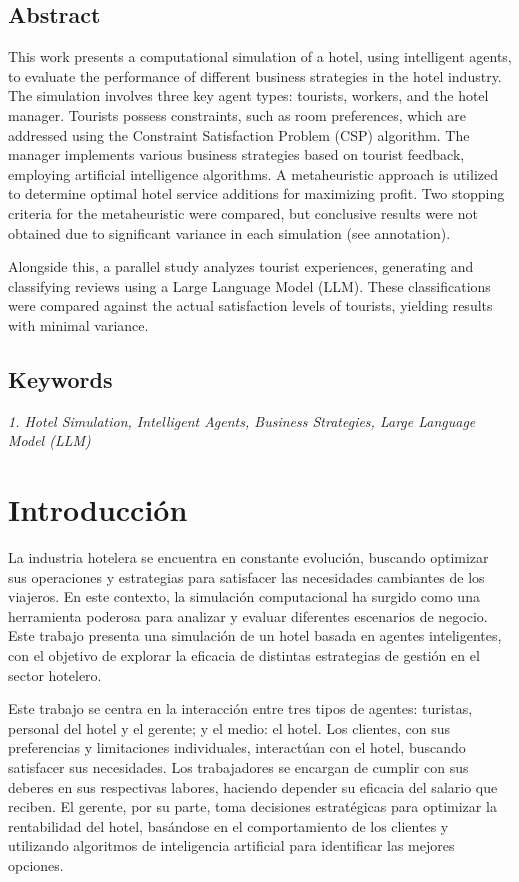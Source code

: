 \documentclass[12pt,a4paper]{article} \usepackage[spanish]{babel} \usepackage{graphicx} \usepackage{amsmath} \usepackage{amsfonts} \usepackage{amssymb} \usepackage{float} \usepackage{geometry}
\begin{document}
\subsection*{Abstract} This work presents a computational simulation of a hotel, using intelligent agents, to evaluate the performance of different business strategies in the hotel industry. The simulation involves three key agent types: tourists, workers, and the hotel manager. Tourists possess constraints, such as room preferences, which are addressed using the Constraint Satisfaction Problem (CSP) algorithm. The manager implements various business strategies based on tourist feedback, employing artificial intelligence algorithms. A metaheuristic approach is utilized to determine optimal hotel service additions for maximizing profit. Two stopping criteria for the metaheuristic were compared, but conclusive results were not obtained due to significant variance in each simulation (see annotation). 

Alongside this, a parallel study analyzes tourist experiences, generating and classifying reviews using a Large Language Model (LLM). These classifications were compared against the actual satisfaction levels of tourists, yielding results with minimal variance.

\subsection*{Keywords}\textit{1. Hotel Simulation, Intelligent Agents, Business Strategies, Large Language Model (LLM)}

\vspace{-1em} \hrulefill

\section{Introducción}

La industria hotelera se encuentra en constante evolución, buscando optimizar sus operaciones y estrategias para satisfacer las necesidades cambiantes de los viajeros. En este contexto, la simulación computacional ha surgido como una herramienta poderosa para analizar y evaluar diferentes escenarios de negocio. Este trabajo presenta una simulación de un hotel basada en agentes inteligentes, con el objetivo de explorar la eficacia de distintas estrategias de gestión en el sector hotelero. 

Este trabajo se centra en la interacción entre tres tipos de agentes: turistas, personal del hotel y el gerente; y el medio: el hotel. Los clientes, con sus preferencias y limitaciones individuales, interactúan con el hotel, buscando satisfacer sus necesidades. Los trabajadores se encargan de cumplir con sus deberes en sus respectivas labores, haciendo depender su eficacia del salario que reciben. El gerente, por su parte, toma decisiones estratégicas para optimizar la rentabilidad del hotel, basándose en el comportamiento de los clientes y utilizando algoritmos de inteligencia artificial para identificar las mejores opciones.
\end{document}
